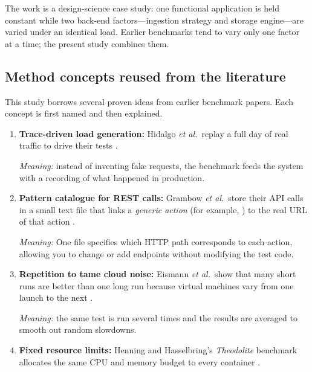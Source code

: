 \documentclass[nomenclature, english, biblatex]{kththesis}
\numberwithin{listing}{chapter}
\begin{document}
The work is a design-science case study: one functional application is held constant while two back-end factors—ingestion strategy and storage engine—are varied under an identical load. Earlier benchmarks tend to vary only one factor at a time; the present study combines them.

\subsection{Method concepts reused from the literature}
This study borrows several proven ideas from earlier benchmark papers.  
Each concept is first named and then explained.

\begin{enumerate}[label=\textbf{C\arabic*}, leftmargin=*]

  \item \textbf{Trace-driven load generation:} 
        Hidalgo \textit{et al.}\ replay a full day of real traffic to drive their tests \cite{Hidalgo2023StreamProcMicroservices}.
        
        \emph{Meaning:} instead of inventing fake requests, the benchmark feeds the system with a recording of what happened in production.

  \item \textbf{Pattern catalogue for REST calls:} 
        Grambow \textit{et al.}\ store their API calls in a small text file that links a \emph{generic action} (for example, ) to the real URL of that action \cite{Grambow2021PatternBenchmark}.
        
        \emph{Meaning:} One file specifies which HTTP path corresponds to each action, allowing you to change or add endpoints without modifying the test code.

  \item \textbf{Repetition to tame cloud noise:} 
        Eismann \textit{et al.}\ show that many short runs are better than one long run because virtual machines vary from one launch to the next \cite{Eismann2020MicroserviceBenchmark}.
        
        \emph{Meaning:} the same test is run several times and the results are averaged to smooth out random slowdowns.

  \item \textbf{Fixed resource limits:} 
        Henning and Hasselbring’s \emph{Theodolite} benchmark allocates the same CPU and memory budget to every container \cite{Henning2021Theodolite}.
        

\end{enumerate}
\end{document}
